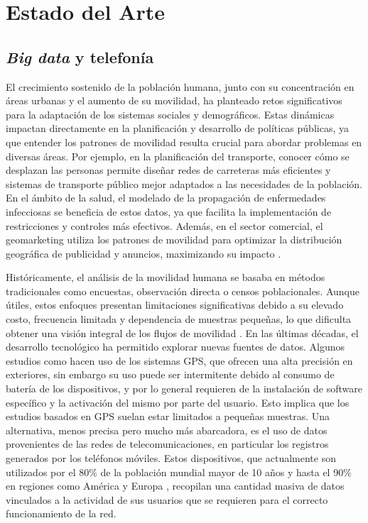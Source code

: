\chapter{Estado del Arte}\label{chapter:state-of-the-art}

\section{\textit{Big data} y telefonía} 

El crecimiento sostenido de la población humana, junto con su concentración en áreas urbanas y el aumento de su movilidad, ha planteado retos significativos para la adaptación de los sistemas sociales y demográficos. Estas dinámicas impactan directamente en la planificación y desarrollo de políticas públicas, ya que entender los patrones de movilidad resulta crucial para abordar problemas en diversas áreas. Por ejemplo, en la planificación del transporte, conocer cómo se desplazan las personas permite diseñar redes de carreteras más eficientes y sistemas de transporte público mejor adaptados a las necesidades de la población. En el ámbito de la salud, el modelado de la propagación de enfermedades infecciosas se beneficia de estos datos, ya que facilita la implementación de restricciones y controles más efectivos. Además, en el sector comercial, el geomarketing utiliza los patrones de movilidad para optimizar la distribución geográfica de publicidad y anuncios, maximizando su impacto \cite{asgari2013survey}.

Históricamente, el análisis de la movilidad humana se basaba en métodos tradicionales como encuestas, observación directa o censos poblacionales. Aunque útiles, estos enfoques presentan limitaciones significativas debido a su elevado costo, frecuencia limitada y dependencia de muestras pequeñas, lo que dificulta obtener una visión integral de los flujos de movilidad \cite{asgari2013survey}. En las últimas décadas, el desarrollo tecnológico ha permitido explorar nuevas fuentes de datos. Algunos estudios como \cite{gong2012gps} hacen uso de los sistemas GPS, que ofrecen una alta precisión en exteriores, sin embargo su uso puede ser intermitente debido al consumo de batería de los dispositivos, y por lo general requieren de la instalación de software específico y la activación del mismo por parte del usuario. Esto implica que los estudios basados en GPS suelan estar limitados a pequeñas muestras. Una alternativa, menos precisa pero mucho más abarcadora, es el uso de datos provenientes de las redes de telecomunicaciones, en particular los registros generados por los teléfonos móviles. Estos dispositivos, que actualmente son utilizados por el 80$\%$ de la población mundial mayor de 10 años y hasta el 90$\%$ en regiones como América y Europa \cite{ITU2024}, recopilan una cantidad masiva de datos vinculados a la actividad de sus usuarios \cite{toole2015path} que se requieren para el correcto funcionamiento de la red.

